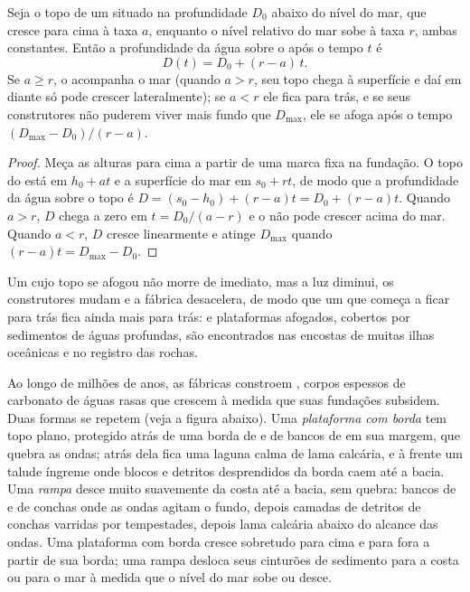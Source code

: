 \begin{proposition}\label{prop:b1:chemical-biogenic-sediments:keep-up}
Seja o topo de um  situado na profundidade $D_0$ abaixo do nível do mar, que cresce
para cima à taxa $a$, enquanto o nível relativo do mar sobe à taxa $r$, ambas constantes.
Então a profundidade da água sobre o  após o tempo $t$ é
\[
D(t) = D_0 + (r - a)\,t .
\]
Se $a \ge r$, o  acompanha o mar (quando $a > r$, seu topo chega à superfície e daí
em diante só pode crescer lateralmente); se $a < r$ ele fica para trás, e se seus
construtores não puderem viver mais fundo que $D_{\max}$, ele se afoga após o tempo
$(D_{\max} - D_0)/(r - a)$.
\end{proposition}

\begin{proof}
Meça as alturas para cima a partir de uma marca fixa na fundação. O topo do  está em
$h_0 + a t$ e a superfície do mar em $s_0 + r t$, de modo que a profundidade da água sobre
o topo é $D = (s_0 - h_0) + (r - a)t = D_0 + (r-a)t$. Quando $a > r$, $D$ chega a zero em
$t = D_0/(a-r)$ e o  não pode crescer acima do mar. Quando $a < r$, $D$ cresce
linearmente e atinge $D_{\max}$ quando $(r-a)t = D_{\max} -
D_0$.
\end{proof}

Um  cujo topo se afogou não morre de imediato, mas a luz diminui, os construtores
mudam e a fábrica desacelera, de modo que um  que começa a ficar para trás fica
ainda mais para trás:  e plataformas afogados, cobertos por sedimentos de águas
profundas, são encontrados nas encostas de muitas ilhas oceânicas e no registro das rochas.

Ao longo de milhões de anos, as fábricas constroem , corpos
espessos de carbonato de águas rasas que crescem à medida que suas fundações subsidem.
Duas formas se repetem (veja a figura abaixo). Uma \emph{plataforma com borda} tem topo
plano, protegido atrás de uma borda de  e de bancos de  em sua margem, que
quebra as ondas; atrás dela fica uma laguna calma de lama calcária, e à frente um talude
íngreme onde blocos e detritos desprendidos da borda caem até a bacia. Uma \emph{rampa}
desce muito suavemente da costa até a bacia, sem quebra: bancos de  e de conchas
onde as ondas agitam o fundo, depois camadas de detritos de conchas varridas por
tempestades, depois lama calcária abaixo do alcance das ondas. Uma plataforma com borda
cresce sobretudo para cima e para fora a partir de sua borda; uma rampa desloca seus
cinturões de sedimento para a costa ou para o mar à medida que o nível do mar sobe ou desce.

